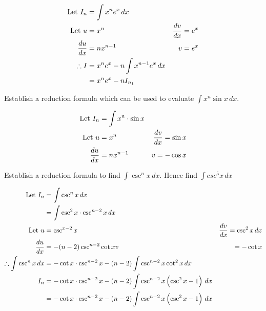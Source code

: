 \documentclass{standalone}
\begin{document}
	\begin{align*}
		\text{Let } I_n & = \int x^ne^x \, dx \\
		\text{Let } u & = x^n      & \frac{dv}{dx} = e^x \\
		\frac{du}{dx}     & = nx^{n-1} & v = e^x         \\
		\therefore I &= x^ne^x - n \int x^{n-1}e^x \, dx\\
		&= x^ne^x - nI_{n_{1}}
	\end{align*}
	
	\begin{example}
		Establish a reduction formula which can be used to evaluate $\int x^n \sin x \, dx$.
	\end{example}
	
	\begin{align*}
		\text{Let } I_n &= \int x^n \cdot \sin x\\
		\text{Let } u & = x^n      & \frac{dv}{dx} = \sin x \\
		\frac{du}{dx}     & = nx^{n-1} & v= -\cos x         
	\end{align*}
	
	\begin{example}
		Establish a reduction formula to find $\int \csc^nx \, dx$. Hence find $\int csc^5x \, dx$
	\end{example}
	\begin{align*}
		\text{Let } I_n &= \int \csc^nx \, dx\\
		&= \int \csc^2x \cdot \csc^{n-2}x \, dx\\
		\text{Let } u & = \csc^{x-2} x              & \frac{dv}{dx} = \csc^2x \, dx \\
		\frac{du}{dx}     & = -(n-2)\csc^{n-2}\cot x  v & = -\cot x                 \\
		\therefore \int \csc^nx \, dx &= -\cot x \cdot \csc^{n-2}x  - (n-2)\int \csc^{n-2}x\cot^2x \, dx\\
		I_n &= 	-\cot x \cdot \csc^{n-2}x - (n-2)\int \csc^{n-2}x\left(\csc^2x - 1\right) \, dx\\
		&= 		-\cot x \cdot \csc^{n-2}x - (n-2)\int \csc^{n-2}x\left(\csc^2x - 1\right) \, dx\\
	\end{align*}
\end{document}

